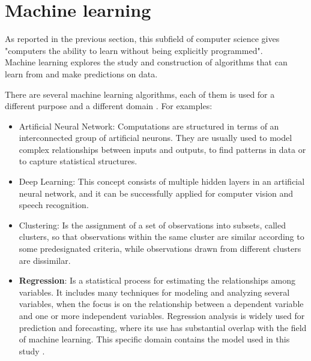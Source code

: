 \newpage


\section{Machine learning}
\vspace{-5mm}
\label{ML}
As reported in the previous section, this subfield of computer science gives "computers the ability to learn without being explicitly programmed"\cite{ArthurSamuel}. \\
Machine learning explores the study and construction of algorithms that can learn from and make predictions on data.

There are several machine learning algorithms, each of them is used for a different purpose and a different domain \cite{wiki:ML}. For examples:

\begin{itemize}
 
  \item Artificial Neural Network: Computations are structured in terms of an interconnected group of artificial neurons. They are usually used to model complex relationships between inputs and outputs, to find patterns in data or to capture statistical structures. 
  
  \item Deep Learning: This concept consists of multiple hidden layers in an artificial neural network, and it can be successfully applied for computer vision and speech recognition.
  
  \item Clustering: Is the assignment of a set of observations into subsets, called clusters, so that observations within the same cluster are similar according to some predesignated criteria, while observations drawn from different clusters are dissimilar.
  
  \item \textbf{Regression}: Is a statistical process for estimating the relationships among variables. It includes many techniques for modeling and analyzing several variables, when the focus is on the relationship between a dependent variable and one or more independent variables. Regression analysis is widely used for prediction and forecasting, where its use has substantial overlap with the field of machine learning. This specific domain contains the model used in this study \cite{wiki:Regression}.
  
 \end{itemize}  

